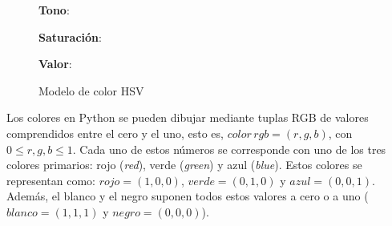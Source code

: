 \begin{figure}[h]{}
    \begin{minipage}[h]{\textwidth}
        \centering
        \parbox[c][1cm]{\textwidth}{\centering \textbf{Tono}: \\}
        \label{fig:hue}
    \end{minipage}
    \begin{minipage}[h]{\textwidth}
        \centering
        \parbox[c][1cm]{\textwidth}{}{\centering \textbf{Saturación}: \\}
        \label{fig:saturation}
    \end{minipage}
    \begin{minipage}[h]{\textwidth}
        \centering
        \parbox[c][1cm]{\textwidth}{\centering \textbf{Valor}: \\}
        \label{fig:value}
    \end{minipage}
    \caption{Modelo de color HSV}
    \label{fig:hsv}
\end{figure}

Los colores en Python se pueden dibujar mediante tuplas RGB de valores comprendidos entre el cero y el uno, esto es, $color \, rgb = (r, g, b)$, con $0 \leq r, g, b \leq 1$. Cada uno de estos números se corresponde con uno de los tres colores primarios: rojo (\textit{red}), verde (\textit{green}) y azul (\textit{blue}). Estos colores se representan como: $rojo = (1, 0, 0)$, $verde = (0, 1, 0)$ y $azul = (0, 0, 1)$. Además, el blanco y el negro suponen todos estos valores a cero o a uno ($blanco = (1, 1, 1)$ y $negro = (0, 0, 0)$). \\

